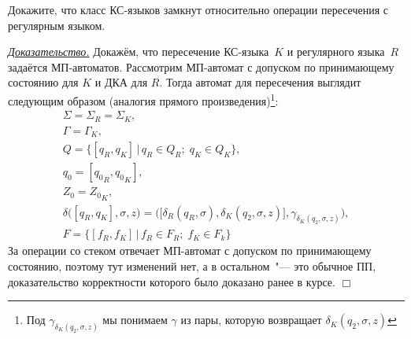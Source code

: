 \documentclass[10pt]{article}
\newcounter{pr} \setcounter{pr}{0}
\newenvironment{pruf}
  {\par
  {\itshape \underline{Доказательство.}}}
  {\hfill $\Box$}
\begin{document}
  \begin{pr}
    Докажите, что класс КС-языков замкнут относительно операции пересечения с
    регулярным языком.
    \begin{pruf}
      Докажём, что пересечение КС-языка~$K$ и регулярного языка~$R$ задаётся
      МП-автоматов. Рассмотрим МП-автомат с допуском по принимающему состоянию
      для $K$ и ДКА для $R$. Тогда автомат для пересечения выглядит следующим
      образом (аналогия прямого произведения)\footnote{Под
      $\gamma_{\delta_K(q_2, \sigma, z)}$ мы понимаем $\gamma$ из пары, которую
      возвращает $\delta_K(q_2, \sigma, z)$}:
      \begin{gather*}
        \Sigma = \Sigma_R = \Sigma_K,\\
        \Gamma = \Gamma_K,\\
        Q = \bigg\{[q_R, q_K] \, | \, q_R \in Q_R;\; q_K \in Q_K\bigg\},\\
        q_0 = [{q_0}_R, {q_0}_K],\\
        Z_0 = {Z_0}_K,\\
        \delta\Big([q_R, q_K], \sigma, z\Big) =
          \Bigg(\Big[\delta_R(q_R, \sigma), \delta_K(q_2, \sigma, z)\Big],
                     \gamma_{\delta_K(q_2, \sigma, z)}\Bigg),\\
        F = \bigg\{[f_R, f_K] \, | \, f_R \in F_R;\; f_K \in F_k\bigg\}
      \end{gather*}
      За операции со стеком отвечает МП-автомат с допуском по принимающему
      состоянию, поэтому тут изменений нет, а в остальном~"--- это обычное ПП,
      доказательство корректности которого было доказано ранее в курсе.
    \end{pruf}
  \end{pr}
\end{document}
